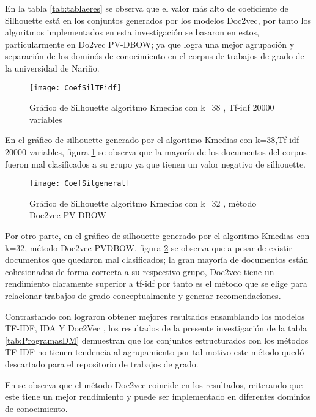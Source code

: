 En la tabla \ref{tab:tablaeres} se observa que el valor más alto de coeficiente de Silhouette está en los conjuntos generados por los modelos Doc2vec, por tanto  los algoritmos implementados en esta investigación se basaron en estos, particularmente en Do2vec PV-DBOW; ya que logra una mejor agrupación y separación de los dominós de conocimiento en el corpus de trabajos de grado de la universidad de Nariño.

\begin{figure}[H]\centering
\texttt{[image: CoefSilTFidf]}
\caption{Gráfico de Silhouette algoritmo Kmedias con k=38 , Tf-idf 20000 variables}
\label{fig:siltfidf}
\end{figure}

En el gráfico de silhouette generado por el algoritmo Kmedias con k=38,Tf-idf 20000 variables, figura \ref{fig:siltfidf} se observa que la mayoría de los documentos del corpus fueron mal clasificados a su grupo ya que tienen un valor negativo de silhouette.

\begin{figure}[H]\centering
\texttt{[image: CoefSilgeneral]}
\caption{Gráfico de Silhouette algoritmo Kmedias con k=32 , método Doc2vec PV-DBOW}
\label{fig:sil1}
\end{figure}

 Por otro parte, en el gráfico de silhouette generado por el algoritmo Kmedias con k=32, método Doc2vec PVDBOW, figura \ref{fig:sil1} se observa que a pesar de existir documentos que quedaron mal clasificados; la gran mayoría de documentos están cohesionados de forma correcta a su respectivo grupo, Doc2vec tiene un rendimiento claramente superior a tf-idf por tanto es el método que se elige para relacionar trabajos de grado conceptualmente y generar recomendaciones.  


Contrastando con \cite{kim2019multi} lograron obtener mejores resultados ensamblando los modelos TF-IDF, IDA Y Doc2Vec , los resultados de la presente investigación de la tabla  \ref{tab:ProgramasDM} demuestran que los conjuntos estructurados con los métodos  TF-IDF  no tienen tendencia al agrupamiento por tal motivo este método quedó descartado para el repositorio de trabajos de grado.

En \cite{nandi2018bangla}  se observa que el método Doc2vec coincide en los resultados, reiterando que este tiene un mejor rendimiento y puede ser implementado en diferentes dominios de conocimiento.



